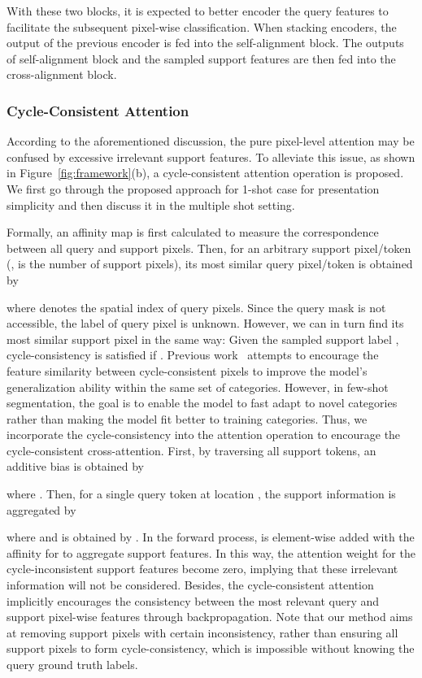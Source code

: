 \documentclass{article}
\begin{document}
With these two blocks, it is expected to better encoder the query features to facilitate the subsequent pixel-wise classification. When stacking  encoders, the output of the previous encoder is fed into the self-alignment block. The outputs of self-alignment block and the sampled support features are then fed into the cross-alignment block. 

\subsubsection{Cycle-Consistent Attention}
According to the aforementioned discussion, the pure pixel-level attention may be confused by excessive irrelevant support features. To alleviate this issue, as shown in Figure~\ref{fig:framework}(b), a cycle-consistent attention operation is proposed. We first go through the proposed approach for 1-shot case for presentation simplicity and then discuss it in the multiple shot setting. 

Formally, an affinity map  
is first calculated to measure the correspondence between all query and support pixels. Then, for an arbitrary support pixel/token  (,  is the number of support pixels), its most similar query pixel/token  is obtained by

where  denotes the spatial index of query pixels. Since the query mask is not accessible, the label of query pixel  is unknown. However, we can in turn find its most similar support pixel  in the same way: 
Given the sampled support label , cycle-consistency is satisfied if . 
Previous work~\cite{kang2020pixelcycle} attempts to encourage the feature similarity between cycle-consistent pixels 
to improve the model's generalization ability within the same set of categories.
However, in few-shot segmentation, the goal is to enable the model to fast adapt to novel categories rather than making the model fit better to training categories. Thus, we incorporate the cycle-consistency into the attention operation to encourage the cycle-consistent cross-attention. 
First, by traversing all support tokens, an additive bias 
 is obtained by

where . Then, for a single query token  at location , the support information is aggregated by

where  and  is obtained by . In the forward process,  is element-wise added with the affinity  for  to aggregate support features. 
In this way, the attention weight for the cycle-inconsistent support features become zero, implying that these irrelevant information will not be considered.
Besides, the cycle-consistent attention implicitly encourages the consistency between the most relevant query and support pixel-wise features through backpropagation. Note that our method aims at removing support pixels with certain inconsistency, rather than ensuring all support pixels to form cycle-consistency, which is impossible without knowing the query ground truth labels.
\end{document}
